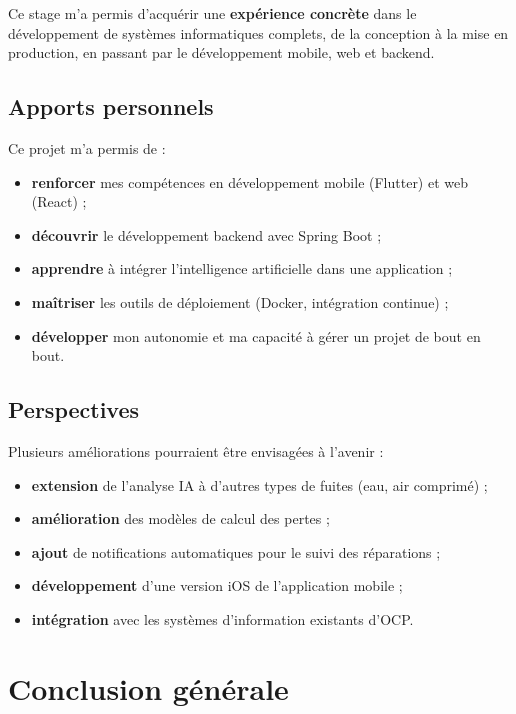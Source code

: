 \documentclass[12pt,a4paper,oneside]{report}
\begin{document}
Ce stage m'a permis d'acquérir une \textbf{expérience concrète} dans le développement de systèmes informatiques complets, de la conception à la mise en production, en passant par le développement mobile, web et backend.

\section{Apports personnels}

Ce projet m'a permis de :
\begin{itemize}
    \item \textbf{renforcer} mes compétences en développement mobile (Flutter) et web (React) ;
    \item \textbf{découvrir} le développement backend avec Spring Boot ;
    \item \textbf{apprendre} à intégrer l'intelligence artificielle dans une application ;
    \item \textbf{maîtriser} les outils de déploiement (Docker, intégration continue) ;
    \item \textbf{développer} mon autonomie et ma capacité à gérer un projet de bout en bout.
\end{itemize}

\section{Perspectives}

Plusieurs améliorations pourraient être envisagées à l'avenir :
\begin{itemize}
    \item \textbf{extension} de l'analyse IA à d'autres types de fuites (eau, air comprimé) ;
    \item \textbf{amélioration} des modèles de calcul des pertes ;
    \item \textbf{ajout} de notifications automatiques pour le suivi des réparations ;
    \item \textbf{développement} d'une version iOS de l'application mobile ;
    \item \textbf{intégration} avec les systèmes d'information existants d'OCP.
\end{itemize}

\chapter*{Conclusion générale}
\end{document}

